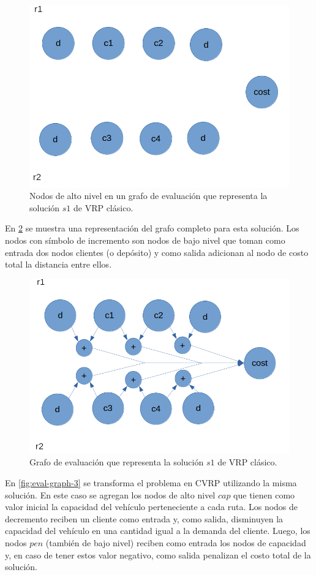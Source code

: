 \begin{figure}
	\centering
	\includegraphics[width=0.9\linewidth]{Graphics/eval-graph-1}
	\caption{Nodos de alto nivel en un grafo de evaluación que representa la solución $s1$ de VRP clásico.}
	\label{fig:eval-graph-1}
\end{figure}

En \ref{fig:eval-graph-2} se muestra una representación del grafo completo para esta solución. Los nodos con símbolo de incremento son nodos de bajo nivel que toman como entrada dos nodos clientes (o depósito) y como salida adicionan al nodo de costo total la distancia entre ellos.

\begin{figure}
	\centering
	\includegraphics[width=0.9\linewidth]{Graphics/eval-graph-2}
	\caption{Grafo de evaluación que representa la solución $s1$ de VRP clásico.}
	\label{fig:eval-graph-2}
\end{figure}

En \ref{fig:eval-graph-3} se transforma el problema en CVRP utilizando la misma solución. En este caso se agregan los nodos de alto nivel $cap$ que tienen como valor inicial la capacidad del vehículo perteneciente a cada ruta. Los nodos de decremento reciben un cliente como entrada y, como salida, disminuyen la capacidad del vehículo en una cantidad igual a la demanda del cliente. Luego, los nodos $pen$ (también de bajo nivel) reciben como entrada los nodos de capacidad y, en caso de tener estos valor negativo, como salida penalizan el costo total de la solución.

